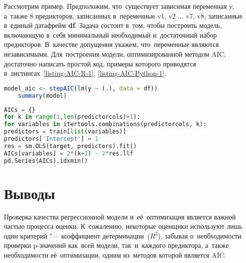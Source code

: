 \documentclass[]{scrartcl}
\begin{document}
Рассмотрим пример. Предположим, что~существует зависимая переменная y, а~также 8 предикторов, записанных в~переменные v1, v2 $\ldots$ v7, v8, записанные в~единый датафрейм \textbf{df}. Задача состоит в~том, чтобы построить модель, включающую в~себя минимальный необходимый и~достаточный набор предикторов. В~качестве допущения укажем, что~переменные являются независимыми. Для~построения модели, оптимизированной методом AIC, достаточно написать простой код, примеры которого приводятся в~листингах~\ref{listing-AIC-R-1}, \ref{listing-AIC-Python-1}. 

\begin{lstlisting}[float, caption = Реализация на~языке R, firstnumber=1, language = R, label= listing-AIC-R-1]
	model_aic <- stepAIC(lm(y ~ (.), data = df))
	summary(model)
\end{lstlisting}

\begin{lstlisting}[float, caption = Реализация на~языке Python, firstnumber=1, language = Python, label = listing-AIC-Python-1]
AICs = {}
for k in range(1,len(predictorcols)+1):
for variables in itertools.combinations(predictorcols, k):
predictors = train[list(variables)]
predictors['Intercept'] = 1
res = sm.OLS(target, predictors).fit()
AICs[variables] = 2*(k+1) - 2*res.llf
pd.Series(AICs).idxmin()
\end{lstlisting}

\section{Выводы}
Проверка качества регрессионной модели и~её~оптимизация является важной частью процесса оценки. К~сожалению, некоторые оценщики используют лишь один критерий "--- коэффициент детерминации~($R^2$), забывая о~необходимости проверки p-значений как~всей модели, так~и~каждого предиктора, а~также необходимости её~оптимизации, одним из~методов которой является AIC. 
\nocite{Wiki:AIC, MLRU:AIC}
\printbibliography[title=Источники информации]
\end{document}
